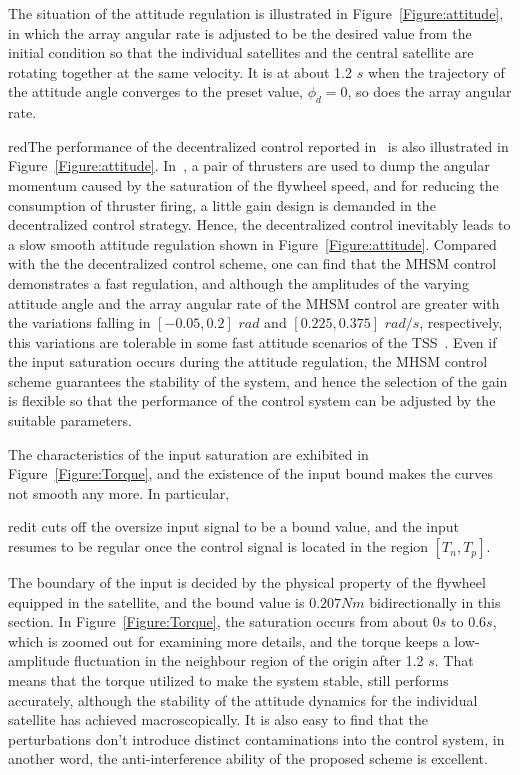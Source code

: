 The situation of the attitude regulation is illustrated in Figure~\ref{Figure:attitude}, in which the array angular rate is adjusted to be the desired value from the initial condition so that the individual satellites and the central satellite are rotating together at the same velocity. It is at about 1.2 $s$ when the trajectory of the attitude angle converges to the preset value, $\phi_d = 0$, so does the array angular rate. \begin{color}{red}The performance of the decentralized control reported in~\cite{chung2008propellant1} is also illustrated in Figure~\ref{Figure:attitude}. In~\cite{chung2008propellant1}, a pair of thrusters are used to dump the angular momentum caused by the saturation of the flywheel speed, and for reducing the consumption of thruster firing, a little gain design is demanded in the decentralized control strategy. Hence, the decentralized control inevitably leads to a slow smooth attitude regulation shown in Figure~\ref{Figure:attitude}. Compared with the the decentralized control scheme, one can find that the MHSM control demonstrates a fast regulation, and although the amplitudes of the varying attitude angle and the array angular rate of the MHSM control are greater with the variations falling in $[-0.05,0.2]$ $rad$ and $[0.225,0.375]$ $rad/s$, respectively, this variations are tolerable in some fast attitude scenarios of the TSS~\cite{Williams2009745}. Even if the input saturation occurs during the attitude regulation, the MHSM control scheme guarantees the stability of the system, and hence the selection of the gain is flexible so that the performance of the control system can be adjusted by the suitable parameters. \end{color}\par
The characteristics of the input saturation are exhibited in Figure~\ref{Figure:Torque}, and the existence of the input bound makes the curves not smooth any more. In particular, \begin{color}{red}it cuts off the oversize input signal to be a bound value, and the input resumes to be regular once the control signal is located in the region $[T_n,T_p]$.\end{color} The boundary of the input is decided by the physical property of the flywheel equipped in the satellite, and the bound value is $0.207Nm$ bidirectionally in this section. In Figure~\ref{Figure:Torque}, the saturation occurs from about $0s$ to $0.6s$, which is zoomed out for examining more details, and the torque keeps a low-amplitude fluctuation in the neighbour region of the origin after 1.2 $s$. That means that the torque utilized to make the system stable, still performs accurately, although the stability of the attitude dynamics for the individual satellite has achieved macroscopically. It is also easy to find that the perturbations don't introduce distinct contaminations into the control system, in another word, the anti-interference ability of the proposed scheme is excellent.
